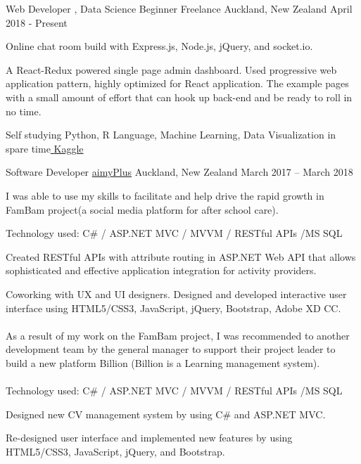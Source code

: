 
\begin{cventries}
	\cventry
	{Web Developer , Data Science Beginner}
	{Freelance}
	{Auckland, \enskip New Zealand}
	{April 2018 - Present}
	{
		\begin{cvitems}
			\item {Online chat room build with Express.js, Node.js, jQuery, and socket.io.\href{https://github.com/ChenMu1/chatroom}{\enskip \color{deepblue}{Online chat room}}
			\item{A React-Redux powered single page admin dashboard. Used progressive web application pattern, highly optimized for React application. The example pages with a small amount of effort that can hook up back-end and be ready to roll in no time.\href{https://github.com/ChenMu1/amazing-react-app}{\enskip \color{deepblue}{ Admin Dashboard}} 
			\item{Self studying Python, R Language, Machine Learning, Data Visualization in spare time\quad  \href{https://www.kaggle.com/chenmu1/kernels}{\color{deepblue} {Kaggle} }
		}
	 }
		}
		\end{cvitems}
	}
\end{cventries}

\begin{cventries}
	\cventry
	{Software Developer}
	{\href{http://www.aimyplus.com/about}{aimyPlus}}
	{Auckland, \enskip New Zealand}
	{March 2017 – March 2018}
	{
		\begin{cvitems}
			{I was able to use my skills to facilitate and help drive the rapid growth in FamBam project(a social media platform for after school care).}\\
			\item {Technology used: C\# / ASP.NET MVC / MVVM / RESTful APIs /MS SQL}
			\item {Created RESTful APIs with attribute routing in ASP.NET Web API that allows sophisticated and effective application integration for activity providers.}
			\item{Coworking with UX and UI designers. Designed and developed interactive user interface using HTML5/CSS3, JavaScript, jQuery, Bootstrap, Adobe XD CC.} \\ \\
			{As a result of my work on the FamBam project, I was recommended to another development team by the general manager to support their project leader to build a new platform Billion (Billion is a Learning management system).}\\ \\
			 {Technology used: C\# / ASP.NET MVC / MVVM / RESTful APIs /MS SQL}
			\item {Designed new CV management system by using C\# and ASP.NET MVC.}
			\item {Re-designed user interface and implemented new features by using HTML5/CSS3, JavaScript, jQuery, and Bootstrap.}
		\end{cvitems}
	}
\end{cventries}

